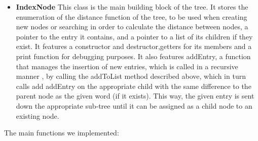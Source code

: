 \documentclass{article}
\begin{document}
\begin{itemize}
  \item \textbf{IndexNode}
  This class is the main building block of the tree. It stores the enumeration of the distance function of the tree, to be used when creating new nodes or searching in order to calculate the distance between nodes, a pointer to the entry it contains, and a pointer to a list of its children if they exist. It features a constructor and destructor,getters for its members and a print function for debugging purposes. It also features addEntry, a function that manages the insertion of new entries, which is called in a recursive manner , by calling the addToList method described above, which in turn calls add addEntry on the appropriate child with the same difference to the parent node as the given word (if it exists). This way, the given entry is sent down the appropriate sub-tree until it can be assigned as a child node to an existing node. 
\end{itemize}
The main functions we implemented:
\end{document}
